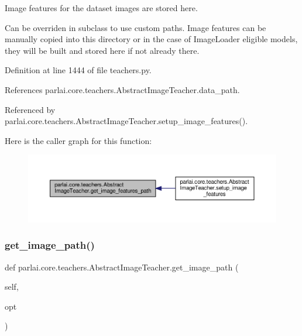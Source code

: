 \begin{DoxyVerb}Image features for the dataset images are stored here.

Can be overriden in subclass to use custom paths.
Image features can be manually copied into this directory or in the
case of ImageLoader eligible models, they will be built and stored here if not already there.\end{DoxyVerb}
 

Definition at line 1444 of file teachers.\+py.



References parlai.\+core.\+teachers.\+Abstract\+Image\+Teacher.\+data\+\_\+path.



Referenced by parlai.\+core.\+teachers.\+Abstract\+Image\+Teacher.\+setup\+\_\+image\+\_\+features().

Here is the caller graph for this function\+:
\nopagebreak
\begin{figure}[H]
\begin{center}
\leavevmode
\includegraphics[width=350pt]{classparlai_1_1core_1_1teachers_1_1AbstractImageTeacher_a29fce019ea9795947235ba208aa4bfb0_icgraph}
\end{center}
\end{figure}
\mbox{\label{classparlai_1_1core_1_1teachers_1_1AbstractImageTeacher_a22a280003b7f4202e0d917040bd56eb8}} 
\subsubsection{\texorpdfstring{get\+\_\+image\+\_\+path()}{get\_image\_path()}}
{\footnotesize\ttfamily def parlai.\+core.\+teachers.\+Abstract\+Image\+Teacher.\+get\+\_\+image\+\_\+path (\begin{DoxyParamCaption}\item[{}]{self,  }\item[{}]{opt }\end{DoxyParamCaption})}

